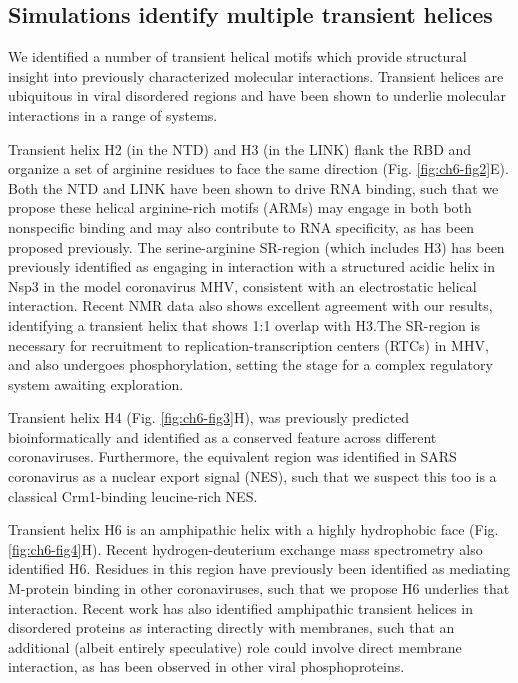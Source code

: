 \documentclass[../main.tex]{subfiles}
\begin{document}
    \subsection{Simulations identify multiple transient helices}
        We identified a number of transient helical motifs which provide structural insight into previously characterized molecular interactions. Transient helices are ubiquitous in viral disordered regions and have been shown to underlie molecular interactions in a range of systems\cite{Guseva2020-nt,Leyrat2011-di,Feuerstein2012-jk,Jensen2008-zu}.

        Transient helix H2 (in the NTD) and H3 (in the LINK) flank the RBD and organize a set of arginine residues to face the same direction (Fig. \ref{fig:ch6-fig2}E). Both the NTD and LINK have been shown to drive RNA binding, such that we propose these helical arginine-rich motifs (ARMs) may engage in both both nonspecific binding and may also contribute to RNA specificity, as has been proposed previously\cite{Chang2009-vd,Bayer2005-tp,Battiste1996-pc}. The serine-arginine SR-region (which includes H3) has been previously identified as engaging in interaction with a structured acidic helix in Nsp3 in the model coronavirus MHV, consistent with an electrostatic helical interaction\cite{Hurst2013-iv,Hurst2010-xi}. Recent NMR data also shows excellent agreement with our results, identifying a transient helix that shows 1:1 overlap with H3\cite{Savastano2020-zf}.The SR-region is necessary for recruitment to replication-transcription centers (RTCs) in MHV, and also undergoes phosphorylation, setting the stage for a complex regulatory system awaiting exploration\cite{Verheije2010-se,Surjit2005-qa}. 

        Transient helix H4 (Fig. \ref{fig:ch6-fig3}H), was previously predicted bioinformatically and identified as a conserved feature across different coronaviruses\cite{Chang2009-vd}. Furthermore, the equivalent region was identified in SARS coronavirus as a nuclear export signal (NES), such that we suspect this too is a classical Crm1-binding leucine-rich NES\cite{Timani2005-xr}.

        Transient helix H6 is an amphipathic helix with a highly hydrophobic face (Fig. \ref{fig:ch6-fig4}H). Recent hydrogen-deuterium exchange mass spectrometry also identified H6\cite{Ye2020-fz}. Residues in this region have previously been identified as mediating M-protein binding in other coronaviruses, such that we propose H6 underlies that interaction\cite{Kuo2002-me,Hurst2005-fx,Verma2006-cw}. Recent work has also identified amphipathic transient helices in disordered proteins as interacting directly with membranes, such that an additional (albeit entirely speculative) role could involve direct membrane interaction, as has been observed in other viral phosphoproteins\cite{Brass2002-on,Braun2017-wi}. 
\end{document}
